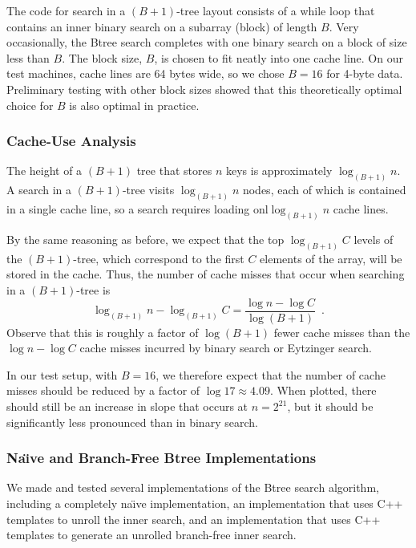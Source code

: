 \documentclass{patmorin}
\begin{document}
The code for search in a $(B+1)$-tree layout consists of a while loop
that contains an inner binary search on a subarray (block) of length
$B$. Very occasionally, the Btree search completes with one binary search
on a block of size less than $B$. The block size, $B$, is chosen to fit
neatly into one cache line. On our test machines, cache lines are 64
bytes wide, so we chose $B=16$ for 4-byte data. Preliminary testing with
other block sizes showed that this theoretically optimal choice for $B$
is also optimal in practice.

\subsubsection{Cache-Use Analysis}

The height of a $(B+1)$ tree that stores $n$ keys is approximately
$\log_{(B+1)} n$.  A search in a $(B+1)$-tree visits $\log_{(B+1)} n$
nodes, each of which is contained in a single cache line, so a search
requires loading onl$\log_{(B+1)} n$ cache lines.

By the same reasoning as before, we expect that the top $\log_{(B+1)} C$
levels of the $(B+1)$-tree, which correspond to the first $C$ elements
of the array, will be stored in the cache.  Thus, the number of cache
misses that occur when searching in a $(B+1)$-tree is
\[
    \log_{(B+1)}n - \log_{(B+1)} C 
         = \frac{\log n - \log C}{\log (B+1)} \enspace .
\]
Observe that this is roughly a factor of $\log(B+1)$ fewer cache misses
than the $\log n-\log C$ cache misses incurred by binary search or
Eytzinger search.

In our test setup, with $B=16$, we therefore expect that the number
of cache misses should be reduced by a factor of $\log 17\approx
4.09$. When plotted, there should still be an increase in slope that
occurs at $n=2^{21}$, but it should be significantly less pronounced
than in binary search.

\subsubsection{Na\"{\i}ve and Branch-Free Btree Implementations}

We made and tested several implementations of the Btree search algorithm,
including a completely na\"{\i}ve implementation, an implementation that
uses C++ templates to unroll the inner search, and an implementation
that uses C++ templates to generate an unrolled branch-free inner search.
\end{document}
